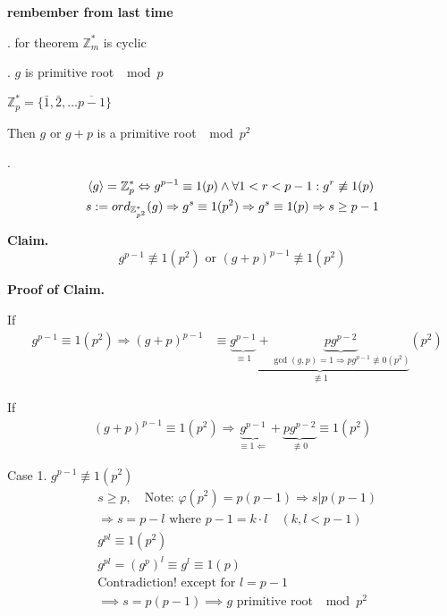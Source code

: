 

\textbf{rembember from last time}

\Proof.
for theorem $\mathbb{Z}_m^{*}$ is cyclic

\Lemma. $g$ is primitive root $\mod p$

$\mathbb{Z}_p^{*} = \{\bar{1}, \bar{2}, \ldots \overline{p-1}\}$

Then $g$ or $g+p$ is a primitive root $\mod p^2$

\Proof.
\begin{align*}
  &\left\langle g \right\rangle = \mathbb{Z}_p^{*} \Leftrightarrow g^{p-1} \equiv 1 (p) \land \forall 1 < r < p-1 : g^r \not\equiv 1(p) \\
  &s : = ord_{\mathbb{Z}_{p^2}^{*}} (g) \Rightarrow g^s \equiv 1 (p^2) \Rightarrow g^s \equiv 1 (p) \Rightarrow s \geq p-1
\end{align*}

\textbf{Claim.}
\[
  g^{p-1} \not\equiv 1 (p^2) \text{ or } (g+p)^{p-1} \not\equiv 1(p^2)
\]

\textbf{Proof of Claim.}

If
\begin{align*}
  &g^{p-1} \equiv 1(p^2) \Rightarrow (g+p)^{p-1}
  &\equiv \underbrace{\underbrace{g^{p-1}}_{\equiv 1} + \underbrace{pg^{p-2}}_{\gcd(g,p) = 1 \Rightarrow pg^{p-1}\not\equiv 0 (p^2)}}_{\not\equiv 1} (p^2)
\end{align*}

If
\begin{align*}
  (g+p)^{p-1} \equiv 1(p^2) \Rightarrow \underbrace{g^{p-1}}_{\equiv 1 \Leftarrow} + \underbrace{pg^{p-2}}_{\not\equiv 0} \equiv 1 (p^2)
\end{align*}

Case 1. $g^{p-1} \not\equiv 1 (p^2)$
\begin{align*}
  &s \geq p, \quad\text{Note: } \varphi(p^2) = p(p-1) \Rightarrow s|p(p-1) \\
  &\Rightarrow s = p-l \text{ where } p-1 = k\cdot l \quad (k,l < p-1) \\
  &g^{pl} \equiv 1 (p^2) \\
  &g^{pl} = (g^p)^l \equiv g^l \equiv 1 (p) \\
  &\text{Contradiction! except for } l = p-1 \\
  &\implies s = p(p-1) \implies g \text{ primitive root } \mod p^2
\end{align*}

